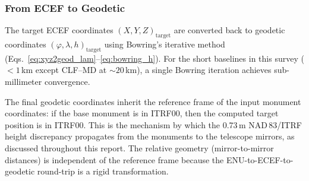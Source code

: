 \subsubsection{From ECEF to Geodetic}

The target ECEF coordinates $(X, Y, Z)_{\text{target}}$ are converted back to geodetic coordinates $(\varphi, \lambda, h)_{\text{target}}$ using Bowring's iterative method (Eqs.~\ref{eq:xyz2geod_lam}--\ref{eq:bowring_h}). For the short baselines in this survey ($< 1$\,km except CLF--MD at $\sim\!20$\,km), a single Bowring iteration achieves sub-millimeter convergence.

The final geodetic coordinates inherit the reference frame of the input monument coordinates: if the base monument is in ITRF00, then the computed target position is in ITRF00. This is the mechanism by which the 0.73\,m NAD\,83/ITRF height discrepancy propagates from the monuments to the telescope mirrors, as discussed throughout this report. The relative geometry (mirror-to-mirror distances) is independent of the reference frame because the ENU-to-ECEF-to-geodetic round-trip is a rigid transformation.



